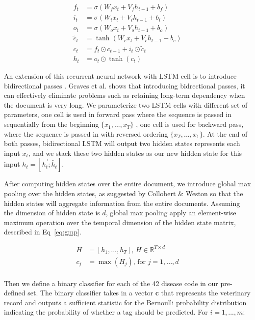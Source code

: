 \documentclass{article}[11pt,oneside]
\def\reals{\mathbb{R}}
\begin{document}
\begin{equation}
\begin{split}
f_t & = \sigma(W_f x_t + V_f h_{t - 1} + b_f) \\
i_t & = \sigma(W_i x_t + V_i h_{t - 1} + b_i) \\
o_t & = \sigma(W_o x_t + V_o h_{t - 1} + b_o) \\
\tilde{c}_t & = \tanh(W_c x_t + V_c h_{t - 1} + b_c) \\
c_t & = f_t \odot c_{t - 1} + i_t \odot \tilde{c}_t \\
h_t & = o_t \odot \tanh(c_t)
\end{split}
\label{eq:lstm}
\end{equation}

An extension of this recurrent neural network with LSTM cell is to introduce bidirectional passes \cite{graves2005bidirectional}. Graves et al. shows that introducing bidrectional passes, it can effectively eliminate problems such as retaining long-term dependency when the document is very long. We parameterize two LSTM cells with different set of parameters, one cell is used in forward pass where the sequence is passed in sequentially from the beginning $\{x_1, ..., x_T\}$ , one cell is used for backward pass, where the sequence is passed in with reversed ordering $\{x_T, ..., x_1\}$. At the end of both passes, bidirectional LSTM will output two hidden states represents each input $x_t$, and we stack these two hidden states as our new hidden state for this input $ h_t = [\overrightarrow{h_t};\overleftarrow{h_t}]$.

After computing hidden states over the entire document, we introduce global max pooling over the hidden states, as suggested by Collobert \& Weston \cite{collobert2008unified} so that the hidden states will aggregate information from the entire documents. Assuming the dimension of hidden state is $d$, global max pooling apply an element-wise maximum operation over the temporal dimension of the hidden state matrix, described in Eq~\ref{eq:gmp}.

\begin{equation}
\begin{aligned}
H &= [h_1, ..., h_T] \text{, } H \in \reals^{T \times d} \\
c_j &= \max(H_{j}) \text{, for } j = 1, ..., d\\
\end{aligned}
\label{eq:gmp}
\end{equation}

Then we define a binary classifier for each of the 42 disease code in our pre-defined set. The binary classifier takes in a vector $\bm{c}$ that represents the veterinary record and outputs a sufficient statistic for the Bernoulli probability distribution indicating the probability of whether a tag should be predicted. For $i = 1, ..., m$:
\end{document}
